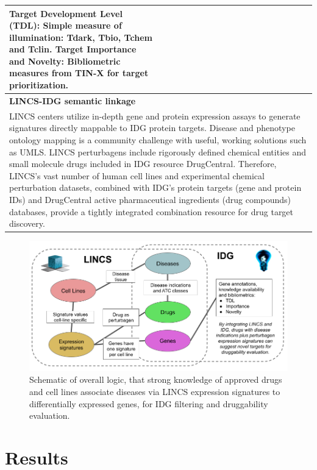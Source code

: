 \begin{table}
\begin{center}
\begin{tabular}{|p{0.5\linewidth}|p{0.5\linewidth}|}
\textbf{Target Development Level (TDL)}: Simple measure of illumination: Tdark, Tbio, Tchem and Tclin.\newline
\textbf{Target Importance and Novelty}: Bibliometric measures from TIN-X for target prioritization. \\
\hline
\multicolumn{2}{|p{1.0\linewidth}|}{\textbf{LINCS-IDG semantic linkage}} \\
\hline
\multicolumn{2}{|p{1.0\linewidth}|}{LINCS centers utilize in-depth gene and protein expression assays to generate signatures directly mappable to IDG protein targets. Disease and phenotype ontology mapping is a community challenge with useful, working solutions such as UMLS\cite{Bodenreider2004-gn}. LINCS perturbagens include rigorously defined chemical entities and small molecule drugs included in IDG resource DrugCentral. Therefore, LINCS’s vast number of human cell lines and experimental chemical perturbation datasets, combined with IDG’s protein targets (gene and protein IDs) and DrugCentral active pharmaceutical ingredients (drug compounds) databases, provide a tightly integrated combination resource for drug target discovery.} \\
\hline
\end{tabular}
\end{center}
\label{table:LINCS-IDG-Conc}
\end{table}


\begin{figure}
	\includegraphics[width=\textwidth]{figures/kgap/KGAP_LINCS-IDG Schematic.png}
	\caption{Schematic of overall logic, that strong knowledge of approved drugs and cell lines associate diseases via LINCS expression signatures to differentially expressed genes, for IDG filtering and druggability evaluation.}
	\label{fig:KGAP_LINCS-IDG_Schematic}
\end{figure}

\section {Results}

